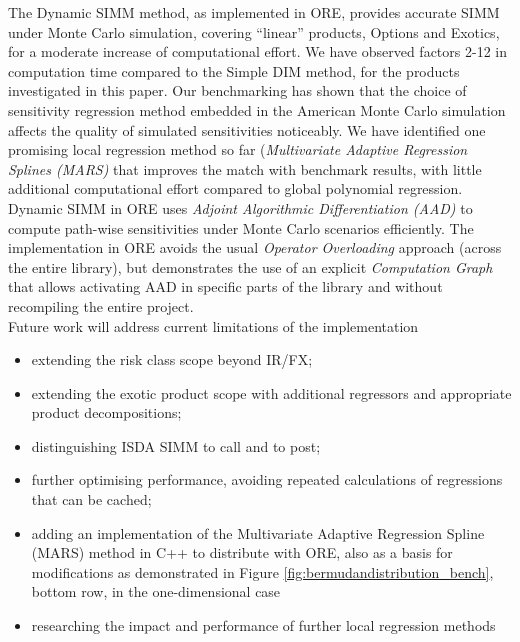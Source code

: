 \documentclass[11pt,a4paper,oneside]{article}
\begin{document}

The Dynamic SIMM method, as implemented in ORE, provides accurate SIMM under Monte Carlo simulation, covering ``linear'' products, Options and Exotics,
for a moderate increase of computational effort. We have observed factors 2-12 in computation time compared to the Simple DIM method,
for the products investigated in this paper. Our benchmarking has shown that the choice of sensitivity regression method embedded in the American Monte Carlo simulation 
affects the quality of simulated sensitivities noticeably. We have identified one promising local regression method so far ({\em Multivariate Adaptive Regression
Splines (MARS)} that improves the match with benchmark results, with little additional computational effort compared to global polynomial regression.
Dynamic SIMM in ORE uses {\em Adjoint Algorithmic Differentiation (AAD)} to compute path-wise sensitivities under Monte Carlo scenarios efficiently. The
implementation in ORE avoids the usual {\em Operator Overloading} approach (across the entire library), but demonstrates the use of an explicit
{\em Computation Graph} that allows activating AAD in specific parts of the library and without recompiling the entire project. \\

\noindent
Future work will address current limitations of the implementation
\begin{itemize}
\item extending the risk class scope beyond IR/FX;
\item extending the exotic product scope with additional regressors and appropriate product decompositions;
\item distinguishing ISDA SIMM to call and to post;
\item further optimising performance, avoiding repeated calculations of regressions that can be cached;
\item adding an implementation of the Multivariate Adaptive Regression Spline (MARS) method in C++ to distribute with ORE,
  also as a basis for modifications as demonstrated in Figure \ref{fig:bermudandistribution_bench}, bottom row, in the one-dimensional case
\item researching the impact and performance of further local regression methods
\end{itemize}
\end{document}
